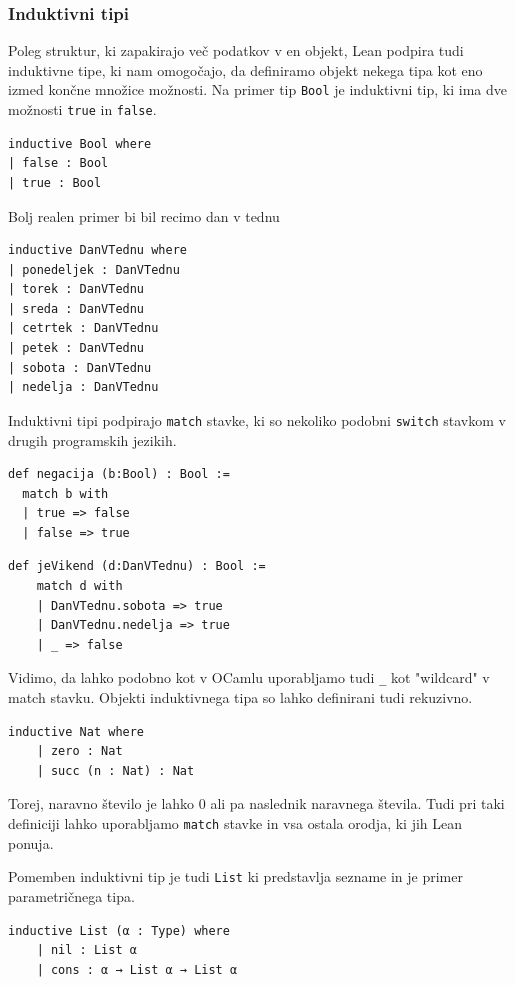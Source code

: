 \documentclass[mat1]{fmfdelo}
\begin{document}
\subsubsection{Induktivni tipi}
Poleg struktur, ki zapakirajo več podatkov v en objekt, Lean podpira tudi induktivne tipe, ki nam omogočajo, da definiramo objekt nekega tipa
kot eno izmed končne množice možnosti. Na primer tip \lstinline{Bool} je induktivni tip, ki ima dve možnosti \lstinline{true} in \lstinline{false}.
\begin{lstlisting}
inductive Bool where
| false : Bool
| true : Bool
\end{lstlisting}

Bolj realen primer bi bil recimo dan v tednu
\begin{lstlisting}
inductive DanVTednu where
| ponedeljek : DanVTednu
| torek : DanVTednu
| sreda : DanVTednu
| cetrtek : DanVTednu
| petek : DanVTednu
| sobota : DanVTednu
| nedelja : DanVTednu
\end{lstlisting}

Induktivni tipi podpirajo \lstinline{match} stavke, ki so nekoliko podobni \lstinline{switch} stavkom v drugih programskih jezikih.

\begin{lstlisting}
def negacija (b:Bool) : Bool :=
  match b with
  | true => false
  | false => true
\end{lstlisting}

\begin{lstlisting}
def jeVikend (d:DanVTednu) : Bool :=
    match d with
    | DanVTednu.sobota => true
    | DanVTednu.nedelja => true
    | _ => false
\end{lstlisting}

Vidimo, da lahko podobno kot v OCamlu uporabljamo tudi \lstinline{_} kot "wildcard" v match stavku.
Objekti induktivnega tipa so lahko definirani tudi rekuzivno.
\begin{lstlisting}
inductive Nat where
    | zero : Nat
    | succ (n : Nat) : Nat
\end{lstlisting}
Torej, naravno število je lahko 0 ali pa naslednik naravnega števila. Tudi pri taki definiciji lahko uporabljamo \lstinline{match} stavke
in vsa ostala orodja, ki jih Lean ponuja.

Pomemben induktivni tip je tudi \lstinline{List} ki predstavlja sezname in je primer parametričnega tipa.
\begin{lstlisting}
inductive List (α : Type) where
    | nil : List α
    | cons : α → List α → List α
\end{lstlisting}
\end{document}
